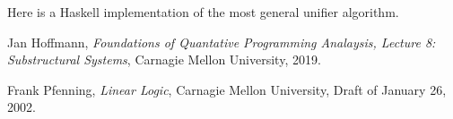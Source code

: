 \documentclass{article}
\begin{document}
Here is a Haskell implementation of the most general unifier algorithm.



\begin{thebibliography}{9}

  Jan Hoffmann,
  \textit{Foundations of Quantative Programming Analaysis, Lecture 8: Substructural Systems},
  Carnagie Mellon University,
  2019.

  Frank Pfenning,
  \textit{Linear Logic},
  Carnagie Mellon University,
  Draft of January 26, 2002.
  
\end{thebibliography}
\end{document}
